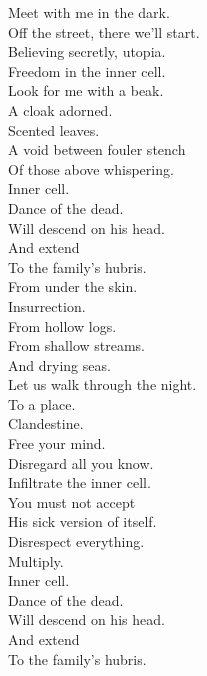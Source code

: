 Meet with me in the dark. \\
Off the street, there we'll start. \\
Believing secretly, utopia. \\
Freedom in the inner cell. \\

Look for me with a beak. \\
A cloak adorned. \\
Scented leaves. \\
A void between fouler stench \\
Of those above whispering. \\
Inner cell. \\

Dance of the dead. \\
Will descend on his head. \\
And extend \\
To the family's hubris. \\

From under the skin. \\
Insurrection. \\
From hollow logs. \\
From shallow streams. \\
And drying seas. \\

Let us walk through the night. \\
To a place. \\
Clandestine. \\
Free your mind. \\
Disregard all you know. \\
Infiltrate the inner cell. \\

You must not accept \\
His sick version of  itself. \\
Disrespect everything. \\
Multiply. \\
Inner cell. \\

Dance of the dead. \\
Will descend on his head. \\
And extend \\
To the family's hubris. \\


